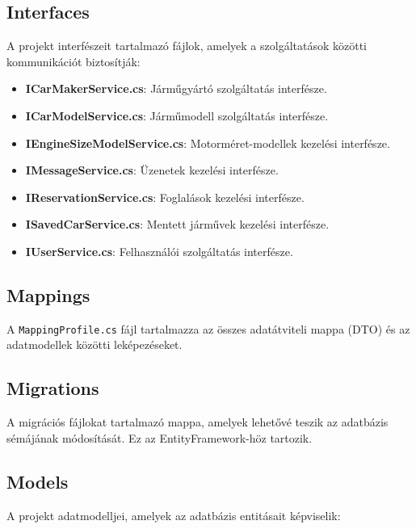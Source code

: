 \documentclass{report}[11pt]
\begin{document}
\subsection{Interfaces}
A projekt interfészeit tartalmazó fájlok, amelyek a szolgáltatások közötti kommunikációt biztosítják:

\begin{itemize}
    \item \textbf{ICarMakerService.cs}: Járműgyártó szolgáltatás interfésze.
    \item \textbf{ICarModelService.cs}: Járműmodell szolgáltatás interfésze.
    \item \textbf{IEngineSizeModelService.cs}: Motorméret-modellek kezelési interfésze.
    \item \textbf{IMessageService.cs}: Üzenetek kezelési interfésze.
    \item \textbf{IReservationService.cs}: Foglalások kezelési interfésze.
    \item \textbf{ISavedCarService.cs}: Mentett járművek kezelési interfésze.
    \item \textbf{IUserService.cs}: Felhasználói szolgáltatás interfésze.
\end{itemize}

\subsection{Mappings}
A \texttt{MappingProfile.cs} fájl tartalmazza az összes adatátviteli mappa (DTO) és az adatmodellek közötti leképezéseket.

\subsection{Migrations}
A migrációs fájlokat tartalmazó mappa, amelyek lehetővé teszik az adatbázis sémájának módosítását. Ez az EntityFramework-höz tartozik.

\subsection{Models}
A projekt adatmodelljei, amelyek az adatbázis entitásait képviselik:
\end{document}
